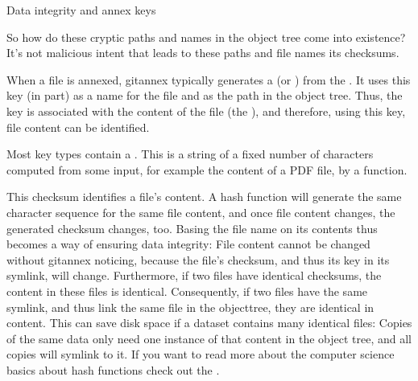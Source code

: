 \ignorespaces {}\label{\detokenize{basics/101-115-symlinks:objecttree}}\begin{findoutmore}[label={fom-objecttree}, before title={\thetcbcounter\ }, float, floatplacement=tbp, check odd page=true]{Data integrity and annex keys}
\label{\detokenize{basics/101-115-symlinks:fom-objecttree}}

\sphinxAtStartPar
So how do these cryptic paths and names in the object tree come into existence?
It’s not malicious intent that leads to these paths and file names \sphinxhyphen{} its checksums.

\sphinxAtStartPar
When a file is annexed, git\sphinxhyphen{}annex typically generates a  (or {\hyperref[\detokenize{glossary:term-annex-key}]{}}) from the .
It uses this key (in part) as a name for the file and as the path
in the object tree.
Thus, the key is associated with the content of the file (the ),
and therefore, using this key, file content can be identified.

\sphinxAtStartPar
Most key types contain a {\hyperref[\detokenize{glossary:term-checksum}]{}}. This is a string of a fixed number of characters
computed from some input, for example the content of a PDF file,
by a  function.

\sphinxAtStartPar
This checksum  identifies a file’s content.
A hash function will generate the same character sequence for the same file content, and once file content changes, the generated checksum changes, too.
Basing the file name on its contents thus becomes a way of ensuring data integrity:
File content cannot be changed without git\sphinxhyphen{}annex noticing, because the file’s checksum, and thus its key in its symlink, will change.
Furthermore, if two files have identical checksums, the content in these files is identical.
Consequently, if two files have the same symlink, and thus link the same file in the object\sphinxhyphen{}tree, they are identical in content.
This can save disk space if a dataset contains many identical files: Copies of the same data only need one instance of that content in the object tree, and all copies will symlink to it.
If you want to read more about the computer science basics about hash functions check out the .


\end{findoutmore}

